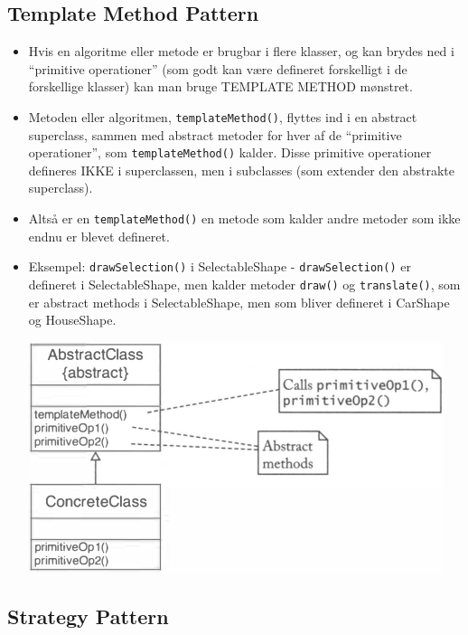\subsection{Template Method Pattern}

\begin{itemize}
  \item Hvis en algoritme eller metode er brugbar i flere klasser, og kan brydes ned i “primitive operationer” (som godt kan være defineret forskelligt i de forskellige klasser) kan man bruge TEMPLATE METHOD mønstret.
  \item Metoden eller algoritmen, \verb|templateMethod()|, flyttes ind i en abstract superclass, sammen med abstract metoder for hver af de “primitive operationer”, som \verb|templateMethod()| kalder. Disse primitive operationer defineres IKKE i superclassen, men i subclasses (som extender den abstrakte superclass). 
  \item Altså er en \verb|templateMethod()| en metode som kalder andre metoder som ikke endnu er blevet defineret.
  \item Eksempel: \verb|drawSelection()| i SelectableShape - \verb|drawSelection()| er defineret i SelectableShape, men kalder metoder \verb|draw()| og \verb|translate()|, som er abstract methods i SelectableShape, men som bliver defineret i CarShape og HouseShape.
    
  \begin{center}
    \includegraphics[scale=0.8]{images/template_method_horstman.png}
  \end{center}

\end{itemize}

\subsection{Strategy Pattern}

